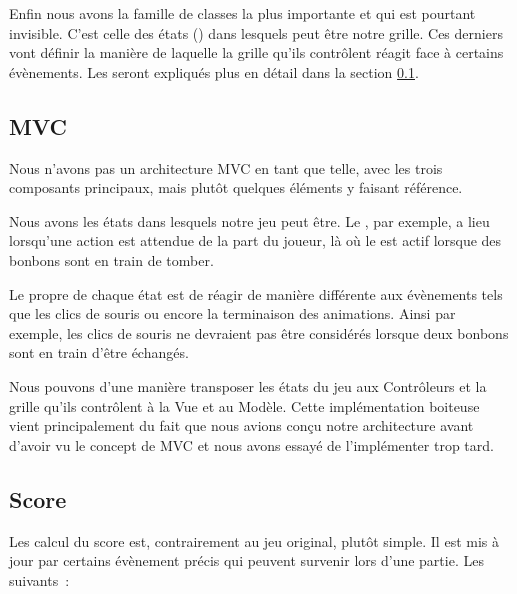 \documentclass[11pt,a4paper]{article}
\newcommand{\addcode}[3]{
	\begin{center}
		
	\end{center}
}
\begin{document}
\addcode{code/cellContent.hpp}{C++}{}{}
\addcode{code/fruit.hpp}{C++}{}{}

Enfin nous avons la famille de classes la plus importante et
qui est pourtant invisible. C'est celle des états
(\verb@State@) dans lesquels peut être notre grille.
Ces derniers vont définir la manière de laquelle la grille
qu'ils contrôlent réagit face à certains évènements.
Les \verb@State@s seront expliqués plus en détail dans la
section \ref{mvc}.

\addcode{code/state.hpp}{C++}{}{}
\addcode{code/readyState.hpp}{C++}{}{}




\subsection{MVC} \label{mvc}

Nous n'avons pas un architecture MVC en tant que telle, avec
les trois composants principaux, mais plutôt quelques éléments y
faisant référence.

Nous avons les états dans lesquels notre jeu
peut être. Le \verb@ReadyState@, par exemple, a
lieu lorsqu'une action est attendue de la part du joueur, là
où le \verb@FallState@ est actif lorsque des bonbons sont
en train de tomber.

Le propre de chaque état est de réagir de manière différente
aux évènements tels que les clics de souris ou encore la
terminaison des animations. Ainsi par exemple, les clics de souris ne devraient
pas être considérés lorsque deux bonbons sont en train
d'être échangés.

Nous pouvons d'une manière transposer les états du jeu aux Contrôleurs et la
grille qu'ils contrôlent à la Vue et au Modèle.
Cette implémentation boiteuse vient principalement du fait
que nous avions conçu notre architecture avant d'avoir vu le
concept de MVC et nous avons essayé de l'implémenter trop
tard.

\subsection{Score} \label{score}

Les calcul du score est, contrairement au jeu original, plutôt simple.
Il est mis à jour par certains évènement précis qui peuvent
survenir lors d'une partie. Les suivants~:
\end{document}
